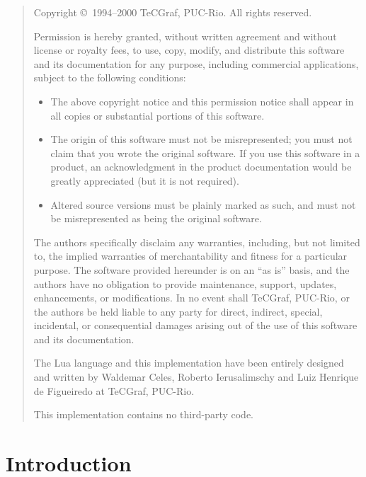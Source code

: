 \documentclass[11pt]{article}
\begin{document}
\newpage
\begin{quotation}
\parskip=10pt
\noindent
\footnotesize
Copyright \copyright\ 1994--2000 TeCGraf, PUC-Rio.  All rights reserved.

\noindent
Permission is hereby granted, without written agreement and without license
or royalty fees, to use, copy, modify, and distribute this software and its
documentation for any purpose, including commercial applications, subject to
the following conditions:
\begin{itemize}
\item The above copyright notice and this permission notice shall appear in all
   copies or substantial portions of this software.

\item The origin of this software must not be misrepresented; you must not
   claim that you wrote the original software. If you use this software in a
   product, an acknowledgment in the product documentation would be greatly
   appreciated (but it is not required).

\item Altered source versions must be plainly marked as such, and must not be
   misrepresented as being the original software.
\end{itemize}
The authors specifically disclaim any warranties, including, but not limited
to, the implied warranties of merchantability and fitness for a particular
purpose.  The software provided hereunder is on an ``as is'' basis, and the
authors have no obligation to provide maintenance, support, updates,
enhancements, or modifications.  In no event shall TeCGraf, PUC-Rio, or the
authors be held liable to any party for direct, indirect, special,
incidental, or consequential damages arising out of the use of this software
and its documentation.

\noindent
The Lua language and this implementation have been entirely designed and
written by Waldemar Celes, Roberto Ierusalimschy and Luiz Henrique de
Figueiredo at TeCGraf, PUC-Rio.

\noindent
This implementation contains no third-party code.
\end{quotation}

\newpage

\tableofcontents

\newpage
\setcounter{page}{1}
\pagestyle{plain}


\section{Introduction}
\end{document}
